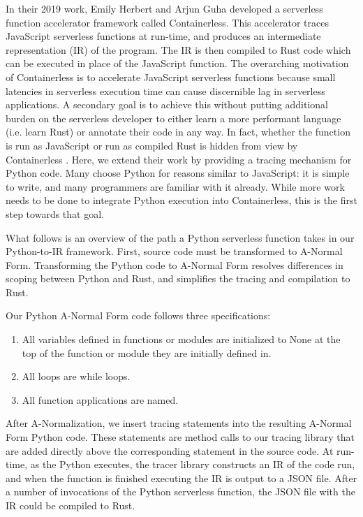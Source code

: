 \documentclass[acmsmall,review,authorversion]{acmart}
\begin{document}
In their 2019 work, Emily Herbert and Arjun Guha developed a serverless function accelerator framework called Containerless. This accelerator traces JavaScript serverless functions at run-time, and produces an intermediate representation (IR) of the program. The IR is then compiled to Rust code which can be executed in place of the JavaScript function. The overarching motivation of Containerless is to accelerate JavaScript serverless functions because small latencies in serverless execution time can cause discernible lag in serverless applications. A secondary goal is to achieve this without putting additional burden on the serverless developer to either learn a more performant language (i.e. learn Rust) or annotate their code in any way. In fact, whether the function is run as JavaScript or run as compiled Rust is hidden from view by Containerless \cite{ServerlessAccel}. Here, we extend their work by providing a tracing mechanism for Python code. Many choose Python for reasons similar to JavaScript: it is simple to write, and many programmers are familiar with it already. While more work needs to be done to integrate Python execution into Containerless, this is the first step towards that goal.
\par

\par
 What follows is an overview of the path a Python serverless function takes in our Python-to-IR framework. First, source code must be transformed to A-Normal Form. Transforming the Python code to A-Normal Form resolves differences in scoping between Python and Rust, and simplifies the tracing and compilation to Rust.
 \par
 Our Python A-Normal Form code follows three specifications:
\begin{enumerate}
    \item All variables defined in functions or modules are initialized to None at the top of the function or module they are initially defined in.
    \item All loops are while loops.
    \item All function applications are named.
\end{enumerate}
After A-Normalization, we insert tracing statements into the resulting A-Normal Form Python code. These statements are method calls to our tracing library that are added directly above the corresponding statement in the source code. At run-time, as the Python executes, the tracer library constructs an IR of the code run, and when the function is finished executing the IR is output to a JSON file. After a number of invocations of the Python serverless function, the JSON file with the IR could be compiled to Rust.
\end{document}
